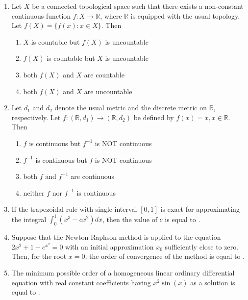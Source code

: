 \documentclass[journal]{IEEEtran}
\numberwithin{equation}{enumi}
\numberwithin{figure}{enumi}
\begin{document}
\begin{enumerate}
\item Let $X$ be a connected topological space such that there exists a non-constant continuous function $f : X \to \mathbb{R}$, where $\mathbb{R}$ is equipped with the usual topology. Let $f(X) = \{f(x) : x \in X\}$. Then
    \begin{enumerate}
        \item $X$ is countable but $f(X)$ is uncountable
        \item $f(X)$ is countable but $X$ is uncountable
        \item both $f(X)$ and $X$ are countable
        \item both $f(X)$ and $X$ are uncountable
    \end{enumerate}
\bigskip

\item Let $d_1$ and $d_2$ denote the usual metric and the discrete metric on $\mathbb{R}$, respectively. Let $f : (\mathbb{R}, d_1) \to (\mathbb{R}, d_2)$ be defined by $f(x) = x, x \in \mathbb{R}$. Then

    \begin{enumerate}
        \item $f$ is continuous but $f^{-1}$ is NOT continuous
        \item $f^{-1}$ is continuous but $f$ is NOT continuous
        \item both $f$ and $f^{-1}$ are continuous
        \item neither $f$ nor $f^{-1}$ is continuous
    \end{enumerate}
\bigskip

\item If the trapezoidal rule with single interval $[0,1]$ is exact for approximating the integral $\int_0^1 (x^3 - c x^2) dx$, then the value of $c$ is equal to \underline{\hspace{1cm}}.
\bigskip

\item Suppose that the Newton-Raphson method is applied to the equation $2x^2 + 1 - e^{x^2} = 0$ with an initial approximation $x_0$ sufficiently close to zero. Then, for the root $x = 0$, the order of convergence of the method is equal to \underline{\hspace{1cm}}.
\bigskip
    \item The minimum possible order of a homogeneous linear ordinary differential equation with real constant coefficients having $x^2 \sin(x)$ as a solution is equal to \underline{\hspace{1cm}}.
    

\end{enumerate}
\end{document}
